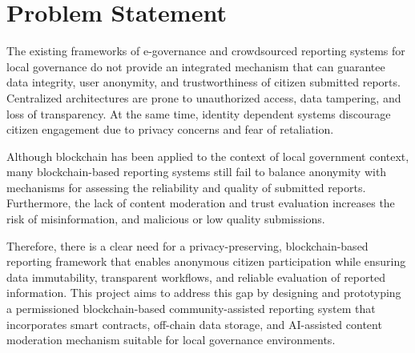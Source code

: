 \section{Problem Statement}

The existing frameworks of e-governance and crowdsourced reporting systems for local governance do not provide an integrated mechanism that can guarantee data integrity, user anonymity, and trustworthiness of citizen submitted reports. Centralized architectures are prone to unauthorized access, data tampering, and loss of transparency. At the same time, identity dependent systems discourage citizen engagement due to privacy concerns and fear of retaliation.

Although blockchain has been applied to the context of local government context, many blockchain-based reporting systems still fail to balance anonymity with mechanisms for assessing the reliability and quality of submitted reports. Furthermore, the lack of content moderation and trust evaluation increases the risk of misinformation, and malicious or low quality submissions. 

Therefore, there is a clear need for a privacy-preserving, blockchain-based reporting framework that enables anonymous citizen participation while ensuring data immutability, transparent workflows, and reliable evaluation of reported information. This project aims to address this gap by designing and prototyping a permissioned blockchain-based community-assisted reporting system that incorporates smart contracts, off-chain data storage, and \ac{AI}-assisted content moderation mechanism suitable for local governance environments.






